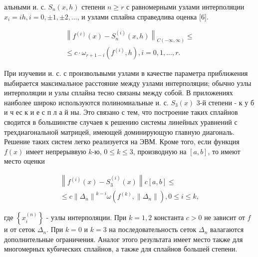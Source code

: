 \documentclass[10pt]{article}
\begin{document}
альными и. с. $S_{n}(x, h)$ степени $n \geqslant r$ с равномерными узлами интерполяции $x_{i}=i h, i=0, \pm 1, \pm 2, \ldots$, и узлами сплайна справедлива оценка [6].



\[

\begin{gathered}

\left\|f^{(i)}(x)-S_{n}^{(i)}(x, h)\right\|_{C(-\infty, \infty)} \leqslant \\

\leqslant c \cdot \omega_{r+1-i}\left(f^{(i)}, h\right), i=0,1, \ldots, r .

\end{gathered}

\]



При изучевии и. с. с произвольвыми узлами в качестве параметра приближения выбирается максимальное расстояние между узлами интерполяции; обычно узлы интерполяции и узлы сплайна тесно связаны между собой. В приложениях наиболее широко используются полиномиальные и. с. $S_{3}(x)$ 3-й степени - к у б и ч ес к и е с п л а й ны. Это связано с тем, что построение таких сплайнов сводится в большинстве случаев к решению системы линейных уравнений с трехдиагональной матрицей, имеющей доминирующую главную диагональ. Решение таких систем легко реализуется на ЭВМ. Кроме того, если функция $f(x)$ имеет непрерыввую $k$-ю, $0 \leqslant k \leqslant 3$, производную на $[a, b]$, то имеют место оценки



\[

\begin{gathered}

\left\|f^{(i)}(x)-S_{3}^{(i)}(x)\right\| c[a, b] \leqslant \\

\leqslant c\left\|\Delta_{n}\right\|^{k-i} \omega\left(f^{(k)},\left\|\Delta_{n}\right\|\right), 0 \leqslant i \leqslant k,

\end{gathered}

\]



где $\left\{x_{i}^{(n)}\right\}$ - узлы интерполяции. При $k=1,2$ константа $c>0$ не зависит от $f$ и от сеток $\Delta_{n}$. При $k=0$ и $k=3$ на последовательность сеток $\Delta_{n}$ валагаются дополнительные ограничения. Аналог этого результата имеет место также для многомерных кубических сплайнов, а также для сплайнов большей степени.
\end{document}

